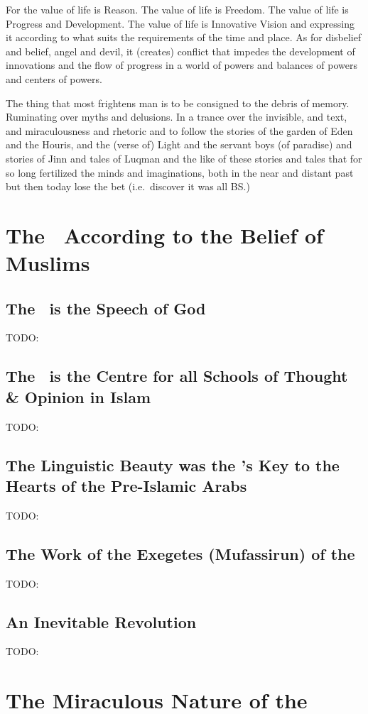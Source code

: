 \documentclass[12pt]{memoir}
\begin{document}
For the value of life is Reason. The value of life is Freedom. The value of
life is Progress and Development. The value of life is Innovative Vision and
expressing it according to what suits the requirements of the time and
place. As for disbelief and belief, angel and devil, it (creates) conflict that
impedes the development of innovations and the flow of progress in a world of
powers and balances of powers and centers of powers.

The thing that most frightens man is to be consigned to the debris of memory.
Ruminating over myths and delusions. In a trance over the invisible, and text,
and miraculousness and rhetoric and to follow the stories of the garden of Eden
and the Houris, and the (verse of) Light and the servant boys (of paradise) and
stories of Jinn and tales of Luqman and the like of these stories and tales
that for so long fertilized the minds and imaginations, both in the near and
distant past but then today lose the bet (i.e.\ discover it was all BS.)


\chapter{The \Quran\ According to the Belief of Muslims}

\section{The \Quran\ is the Speech of God}
TODO:
\section{The \Quran\ is the Centre for all
Schools of Thought \& Opinion in Islam}
TODO:
\section{The Linguistic Beauty was the \Quran’s Key
to the Hearts of the Pre-Islamic Arabs}
TODO:
\section[The Work of the Exegetes of the \Quran]
{The Work of the Exegetes (Mufassirun) of the \Quran}
TODO:
\section{An Inevitable Revolution}
TODO:

\chapter{The Miraculous Nature of the \Quran}
\end{document}
